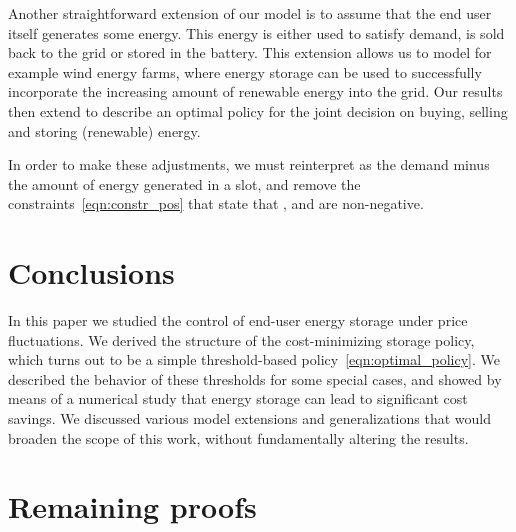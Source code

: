 \documentclass[journal]{IEEEtran}
\newcommand\1{\mathbf{1}}
\begin{document}
Another straightforward extension of our model is to assume that the end user itself generates some energy. This energy is either used to satisfy demand, is sold back to the grid or stored in the battery. This extension allows us to model for example wind energy farms, where energy storage can be used to successfully incorporate the increasing amount of renewable energy into the grid. Our results then extend to describe an optimal policy for the joint decision on buying, selling and storing (renewable) energy.

In order to make these adjustments, we must reinterpret  as the demand minus the amount of energy generated in a slot, and remove the constraints~\eqref{eqn:constr_pos} that state that ,  and  are non-negative.






\section{Conclusions}\label{sec:conclusions}

In this paper we studied the control of end-user energy storage under price fluctuations. We derived the structure of the cost-minimizing storage policy, which turns out to be a simple threshold-based policy~\eqref{eqn:optimal_policy}. We described the behavior of these thresholds for some special cases, and showed by means of a numerical study that energy storage can lead to significant cost savings. We discussed various model extensions and generalizations that would broaden the scope of this work, without fundamentally altering the results.










\appendix
\section{Remaining proofs}
\end{document}
